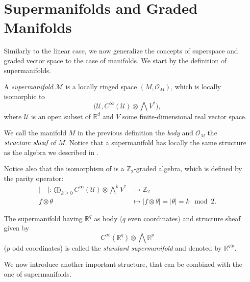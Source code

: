 \section{Supermanifolds and Graded Manifolds}
\label{sec:supermanifolds}

Similarly to the linear case, we now generalize the concepts of superspace and graded vector space to the case of manifolds.
We start by the definition of supermanifolds.

\begin{definition}
\label{def:supermanifold}
    A \emph{supermanifold} $\mathcal{M}$ is a locally ringed space $(M, \mathcal{O}_M)$, which is locally isomorphic to
    \begin{equation*}
        \Big(\mathcal{U}, C^\infty(\mathcal{U}) \otimes \bigwedge V^*\Big),
    \end{equation*}
    where $\mathcal{U}$ is an open subset of $\mathbb{R}^d$ and $V$ some finite-dimensional real vector space.
\end{definition}

We call the manifold $M$ in the previous definition the \emph{body} and $\mathcal{O}_M$ the $\emph{structure sheaf}$ of $M$.
Notice that a supermanifold has locally the same structure as the algebra we described in .

Notice also that the isomorphism of  is a $\mathbb{Z}_2$-graded algebra, which is defined by the parity operator:
\begin{align*}
    |\quad | : 
    \bigoplus_{k \geq 0} C^\infty(\mathcal{U}) \otimes \bigwedge^k V^* 
    &\rightarrow \mathbb{Z}_2 \\
    f \otimes \theta &
    \mapsto |f \otimes \theta| = |\theta| = k \! \! \mod{2}.
\end{align*}

\begin{example}
    The supermanifold having $\mathbb{R}^q$ as body ($q$ even coordinates) and structure sheaf given by
    \begin{equation*}
         C^\infty(\mathbb{R}^q) \otimes \bigwedge \mathbb{R}^p
    \end{equation*}
    ($p$ odd coordinates) is called the \emph{standard supermanifold} and denoted by $\mathbb{R}^{q|p}$.
\end{example}

We now introduce another important structure, that can be combined with the one of supermanifolds.

